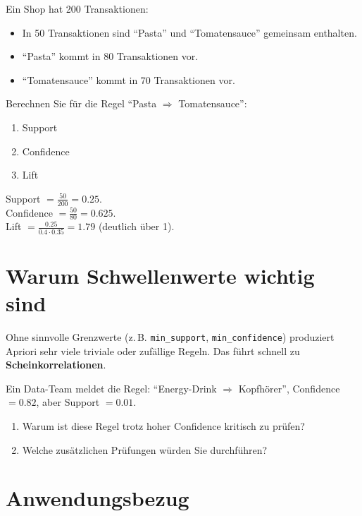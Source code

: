 \begin{myexercise}
Ein Shop hat 200 Transaktionen:
\begin{itemize}
    \item In 50 Transaktionen sind \enquote{Pasta} und \enquote{Tomatensauce} gemeinsam enthalten.
    \item \enquote{Pasta} kommt in 80 Transaktionen vor.
    \item \enquote{Tomatensauce} kommt in 70 Transaktionen vor.
\end{itemize}
Berechnen Sie für die Regel
\enquote{Pasta $\Rightarrow$ Tomatensauce}:
\begin{enumerate}
    \item Support
    \item Confidence
    \item Lift
\end{enumerate}
\begin{myanswer}
Support $= \frac{50}{200}=0.25$. \\
Confidence $= \frac{50}{80}=0.625$. \\
Lift $= \frac{0.25}{0.4\cdot0.35}=1.79$ (deutlich über 1).
\end{myanswer}
\end{myexercise}

\section{Warum Schwellenwerte wichtig sind}

\begin{mycaution}
Ohne sinnvolle Grenzwerte (z.\,B. \texttt{min\_support}, \texttt{min\_confidence})
produziert Apriori sehr viele triviale oder zufällige Regeln.
Das führt schnell zu \textbf{Scheinkorrelationen}.
\end{mycaution}

\begin{myexercise}
Ein Data-Team meldet die Regel:
\enquote{Energy-Drink $\Rightarrow$ Kopfhörer},
Confidence $= 0.82$, aber Support $= 0.01$.
\begin{enumerate}
    \item Warum ist diese Regel trotz hoher Confidence kritisch zu prüfen?
    \item Welche zusätzlichen Prüfungen würden Sie durchführen?
\end{enumerate}
\end{myexercise}

\section{Anwendungsbezug}

